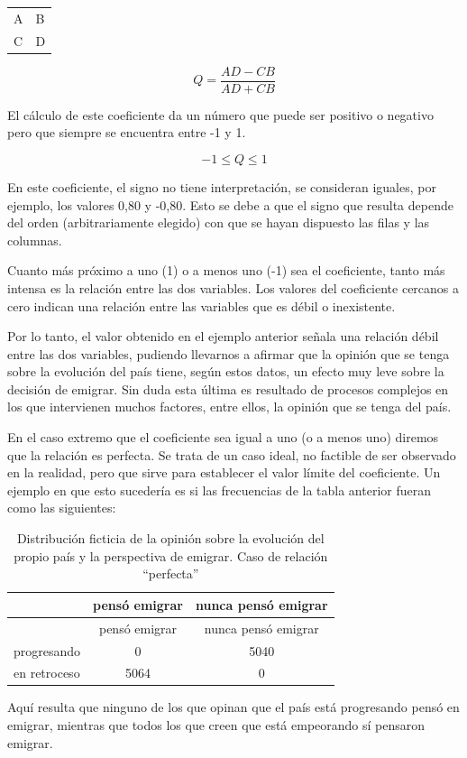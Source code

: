 \documentclass[]{book}
\begin{document}
\begin{longtable}[]{@{}ll@{}}
\toprule
\endhead
A & B\tabularnewline
C & D\tabularnewline
\bottomrule
\end{longtable}

\[Q = \frac{AD - CB}{AD + CB}\]

El cálculo de este coeficiente da un número que puede ser positivo o
negativo pero que siempre se encuentra entre -1 y 1.

\[- 1 \leq Q \leq 1\]

En este coeficiente, el signo no tiene interpretación, se consideran
iguales, por ejemplo, los valores 0,80 y -0,80. Esto se debe a que el
signo que resulta depende del orden (arbitrariamente elegido) con que se hayan dispuesto las filas y las columnas.

Cuanto más próximo a uno (1) o a menos uno (-1) sea el coeficiente,
tanto más intensa es la relación entre las dos variables. Los valores
del coeficiente cercanos a cero indican una relación entre las variables que es débil o inexistente.

Por lo tanto, el valor obtenido en el ejemplo anterior señala una
relación débil entre las dos variables, pudiendo llevarnos a afirmar
que la opinión que se tenga sobre la evolución del país tiene, según estos datos, un efecto muy leve sobre la decisión de emigrar. Sin duda esta última es resultado de procesos complejos en los que intervienen muchos factores, entre ellos, la opinión que se tenga del país.

En el caso extremo que el coeficiente sea igual a uno (o a menos uno)
diremos que la relación es perfecta. Se trata de un caso ideal, no factible de ser observado en la realidad, pero que sirve para establecer el valor límite del coeficiente. Un ejemplo en que esto sucedería es si las frecuencias de la tabla anterior fueran como las siguientes:

\begin{longtable}[]{@{}lcc@{}}
\caption{\label{tab:unnamed-chunk-118}Distribución ficticia de la opinión sobre la evolución del propio país y la perspectiva de emigrar. Caso de relación ``perfecta''}\tabularnewline
\toprule
& pensó emigrar & nunca pensó emigrar\tabularnewline
\midrule
\endfirsthead
\toprule
& pensó emigrar & nunca pensó emigrar\tabularnewline
\midrule
\endhead
progresando & 0 & 5040\tabularnewline
en retroceso & 5064 & 0\tabularnewline
\bottomrule
\end{longtable}

Aquí resulta que ninguno de los que opinan que el país está progresando pensó en emigrar, mientras que todos los que creen que está empeorando sí pensaron emigrar.
\end{document}
